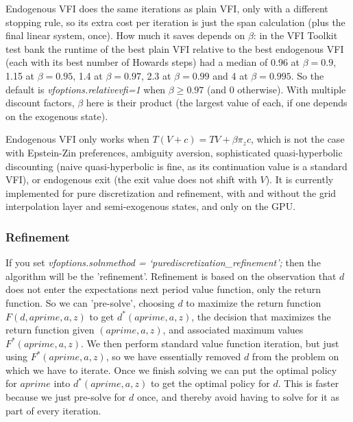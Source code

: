Endogenous VFI does the same iterations as plain VFI, only with a different stopping rule, so its extra cost per iteration is just the span calculation (plus the final linear system, once). How much it saves depends on $\beta$: in the VFI Toolkit test bank the runtime of the best plain VFI relative to the best endogenous VFI (each with its best number of Howards steps) had a median of 0.96 at $\beta=0.9$, 1.15 at $\beta=0.95$, 1.4 at $\beta=0.97$, 2.3 at $\beta=0.99$ and 4 at $\beta=0.995$. So the default is \textit{vfoptions.relativevfi=1} when $\beta\geq 0.97$ (and 0 otherwise). With multiple discount factors, $\beta$ here is their product (the largest value of each, if one depends on the exogenous state).

Endogenous VFI only works when $T(V+c)=TV+\beta\pi_z c$, which is not the case with Epstein-Zin preferences, ambiguity aversion, sophisticated quasi-hyperbolic discounting (naive quasi-hyperbolic is fine, as its continuation value is a standard VFI), or endogenous exit (the exit value does not shift with $V$). It is currently implemented for pure discretization and refinement, with and without the grid interpolation layer and semi-exogenous states, and only on the GPU.

\subsubsection{Refinement} \label{sec:refine}
If you set \textit{vfoptions.solnmethod = ‘purediscretization\_{}refinement’;} then the algorithm will be the 'refinement'. Refinement is based on the observation that $d$ does not enter the expectations next period value function, only the return function. So we can 'pre-solve',  choosing $d$ to maximize the return function $F(d,aprime,a,z)$ to get $d^{*}(aprime,a,z)$, the decision that maximizes the return function given $(aprime,a,z)$, and associated maximum values $F^{*}(aprime,a,z)$. We then perform standard value function iteration, but just using $F^{*}(aprime,a,z)$, so we have essentially removed $d$ from the problem on which we have to iterate. Once we finish solving we can put the optimal policy for $aprime$ into $d^{*}(aprime,a,z)$ to get the optimal policy for $d$. This is faster because we just pre-solve for $d$ once, and thereby avoid having to solve for it as part of every iteration.

